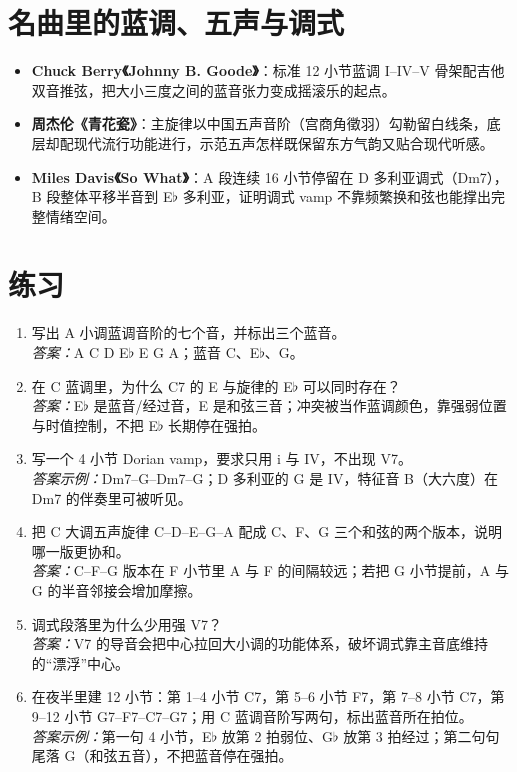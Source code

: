 \section{名曲里的蓝调、五声与调式}

\begin{itemize}
  \item \textbf{Chuck Berry《Johnny B. Goode》}：标准 12 小节蓝调 I--IV--V 骨架配吉他双音推弦，把大小三度之间的蓝音张力变成摇滚乐的起点。
  \item \textbf{周杰伦《青花瓷》}：主旋律以中国五声音阶（宫商角徵羽）勾勒留白线条，底层却配现代流行功能进行，示范五声怎样既保留东方气韵又贴合现代听感。
  \item \textbf{Miles Davis《So What》}：A 段连续 16 小节停留在 D 多利亚调式（Dm7），B 段整体平移半音到 E$\flat$ 多利亚，证明调式 vamp 不靠频繁换和弦也能撑出完整情绪空间。
\end{itemize}

\section{练习}

\begin{exercise}
\begin{enumerate}
  \item 写出 A 小调蓝调音阶的七个音，并标出三个蓝音。\\
  \emph{答案：}A C D E\(\flat\) E G A；蓝音 C、E\(\flat\)、G。
  \item 在 C 蓝调里，为什么 C7 的 E 与旋律的 E\(\flat\) 可以同时存在？\\
  \emph{答案：}E\(\flat\) 是蓝音/经过音，E 是和弦三音；冲突被当作蓝调颜色，靠强弱位置与时值控制，不把 E\(\flat\) 长期停在强拍。
  \item 写一个 4 小节 Dorian vamp，要求只用 i 与 IV，不出现 V7。\\
  \emph{答案示例：}Dm7--G--Dm7--G；D 多利亚的 G 是 IV，特征音 B（大六度）在 Dm7 的伴奏里可被听见。
  \item 把 C 大调五声旋律 C--D--E--G--A 配成 C、F、G 三个和弦的两个版本，说明哪一版更协和。\\
  \emph{答案：}C--F--G 版本在 F 小节里 A 与 F 的间隔较远；若把 G 小节提前，A 与 G 的半音邻接会增加摩擦。
  \item 调式段落里为什么少用强 V7？\\
  \emph{答案：}V7 的导音会把中心拉回大小调的功能体系，破坏调式靠主音底维持的“漂浮”中心。
  \item 在夜半里建 12 小节：第 1--4 小节 C7，第 5--6 小节 F7，第 7--8 小节 C7，第 9--12 小节 G7--F7--C7--G7；用 C 蓝调音阶写两句，标出蓝音所在拍位。\\
  \emph{答案示例：}第一句 4 小节，E\(\flat\) 放第 2 拍弱位、G\(\flat\) 放第 3 拍经过；第二句句尾落 G（和弦五音），不把蓝音停在强拍。
\end{enumerate}
\end{exercise}

